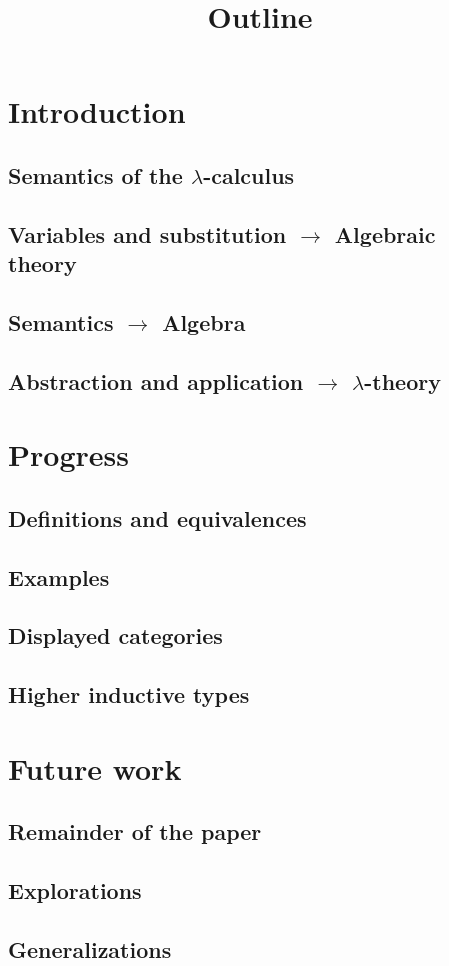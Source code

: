 \documentclass{amsart}
\begin{document}
  \title{Outline}

  \section{Introduction}

  \subsection{Semantics of the $ \lambda $-calculus}

  \subsection{Variables and substitution $ \to $ Algebraic theory}

  \subsection{Semantics $ \to $ Algebra}

  \subsection{Abstraction and application $ \to $ $ \lambda $-theory}

  \section{Progress}

  \subsection{Definitions and equivalences}

  \subsection{Examples}

  \subsection{Displayed categories}

  \subsection{Higher inductive types}

  \section{Future work}

  \subsection{Remainder of the paper}

  \subsection{Explorations}

  \subsection{Generalizations}
\end{document}
